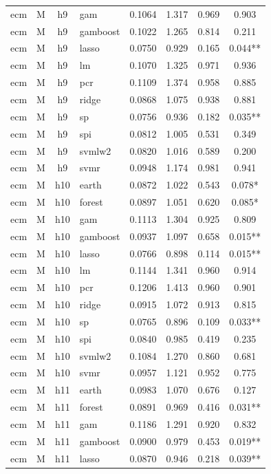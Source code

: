 \begin{ThreePartTable}
\begin{longtable}[t]{llclcccc}
ecm & M & h9 & gam & 0.1064 & 1.317 & 0.969 & 0.903\\
ecm & M & h9 & gamboost & 0.1022 & 1.265 & 0.814 & 0.211\\
ecm & M & h9 & lasso & 0.0750 & 0.929 & 0.165 & 0.044**\\
ecm & M & h9 & lm & 0.1070 & 1.325 & 0.971 & 0.936\\
ecm & M & h9 & pcr & 0.1109 & 1.374 & 0.958 & 0.885\\
ecm & M & h9 & ridge & 0.0868 & 1.075 & 0.938 & 0.881\\
ecm & M & h9 & sp & 0.0756 & 0.936 & 0.182 & 0.035**\\
ecm & M & h9 & spi & 0.0812 & 1.005 & 0.531 & 0.349\\
ecm & M & h9 & svmlw2 & 0.0820 & 1.016 & 0.589 & 0.200\\
ecm & M & h9 & svmr & 0.0948 & 1.174 & 0.981 & 0.941\\
\addlinespace
ecm & M & h10 & earth & 0.0872 & 1.022 & 0.543 & 0.078*\\
ecm & M & h10 & forest & 0.0897 & 1.051 & 0.620 & 0.085*\\
ecm & M & h10 & gam & 0.1113 & 1.304 & 0.925 & 0.809\\
ecm & M & h10 & gamboost & 0.0937 & 1.097 & 0.658 & 0.015**\\
ecm & M & h10 & lasso & 0.0766 & 0.898 & 0.114 & 0.015**\\
ecm & M & h10 & lm & 0.1144 & 1.341 & 0.960 & 0.914\\
ecm & M & h10 & pcr & 0.1206 & 1.413 & 0.960 & 0.901\\
ecm & M & h10 & ridge & 0.0915 & 1.072 & 0.913 & 0.815\\
ecm & M & h10 & sp & 0.0765 & 0.896 & 0.109 & 0.033**\\
ecm & M & h10 & spi & 0.0840 & 0.985 & 0.419 & 0.235\\
ecm & M & h10 & svmlw2 & 0.1084 & 1.270 & 0.860 & 0.681\\
ecm & M & h10 & svmr & 0.0957 & 1.121 & 0.952 & 0.775\\
\addlinespace
ecm & M & h11 & earth & 0.0983 & 1.070 & 0.676 & 0.127\\
ecm & M & h11 & forest & 0.0891 & 0.969 & 0.416 & 0.031**\\
ecm & M & h11 & gam & 0.1186 & 1.291 & 0.920 & 0.832\\
ecm & M & h11 & gamboost & 0.0900 & 0.979 & 0.453 & 0.019**\\
ecm & M & h11 & lasso & 0.0870 & 0.946 & 0.218 & 0.039**\\

\end{longtable}
\end{ThreePartTable}
